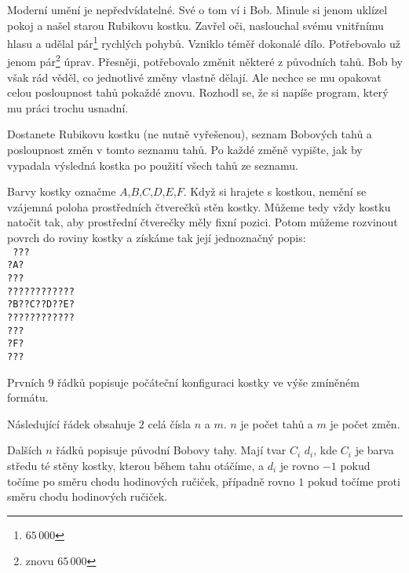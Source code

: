 





Moderní umění je nepředvídatelné.
Své o tom ví i Bob.
Minule si jenom uklízel pokoj
a našel starou Rubikovu kostku.
Zavřel oči, naslouchal svému vnitřnímu hlasu
a udělal pár\footnote{$65\,00$0} rychlých pohybů.
Vzniklo téměř dokonalé dílo.
Potřebovalo už jenom pár\footnote{znovu $65\,000$} úprav.
Přesněji, potřebovalo změnit některé z původních tahů.
Bob by však rád věděl, co jednotlivé změny vlastně dělají.
Ale nechce se mu opakovat celou posloupnost tahů pokaždé znovu.
Rozhodl se, že si napíše program, který mu práci trochu usnadní.


Dostanete Rubikovu kostku (ne nutně vyřešenou),
seznam Bobových tahů a posloupnost změn v tomto seznamu tahů.
Po každé změně vypište, jak by vypadala výsledná kostka
po použití všech tahů ze seznamu.


Barvy kostky označme $A$,$B$,$C$,$D$,$E$,$F$.
Když si hrajete s kostkou, nemění
se vzájemná poloha prostředních čtverečků stěn kostky.
Můžeme tedy vždy kostku natočit tak,
aby prostřední čtverečky měly fixní pozici.
Potom můžeme rozvinout povrch do roviny kostky a získáme
tak její jednoznačný popis:\\
\texttt{
???\\
?A?\\
???\\
????????????\\
?B??C??D??E?\\
????????????\\
???\\
?F?\\
???\\
}


Prvních $9$ řádků popisuje počáteční konfiguraci kostky
ve výše zmíněném formátu.

Následující řádek obsahuje $2$ celá čísla $n$ a $m$.
$n$ je počet tahů a $m$ je počet změn.

Dalších $n$ řádků popisuje původní Bobovy tahy.
Mají tvar $C_i$ $d_i$,
kde $C_i$ je barva středu té stěny kostky,
kterou během tahu otáčíme, a $d_i$ je rovno $-1$
pokud točíme po směru chodu hodinových ručiček, případně
rovno $1$ pokud točíme proti směru chodu hodinových ručiček.

